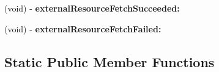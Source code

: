 \begin{DoxyCompactItemize}
\item 
\hypertarget{interface_a_s_i_web_page_request_07_08_ac1f2f0a190aef4ec8f4ac26684f343fb}{
(void) -\/ {\bfseries external\-Resource\-Fetch\-Succeeded\-:}}
\label{interface_a_s_i_web_page_request_07_08_ac1f2f0a190aef4ec8f4ac26684f343fb}

\item 
\hypertarget{interface_a_s_i_web_page_request_07_08_a53fa297981ad0ccbd849852ad407a3ff}{
(void) -\/ {\bfseries external\-Resource\-Fetch\-Failed\-:}}
\label{interface_a_s_i_web_page_request_07_08_a53fa297981ad0ccbd849852ad407a3ff}

\end{DoxyCompactItemize}
\subsection*{\-Static \-Public \-Member \-Functions}

